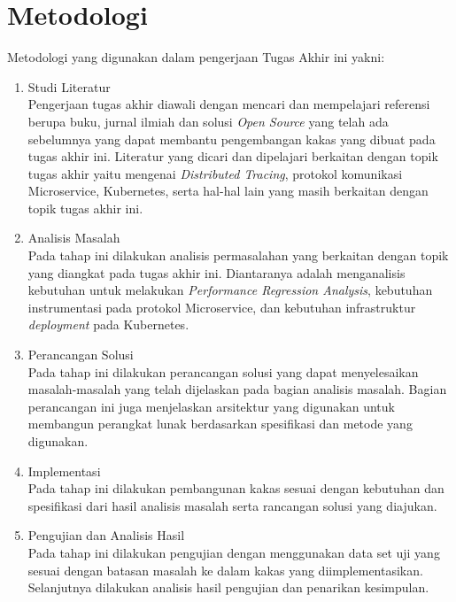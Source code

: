 \section{Metodologi}

Metodologi yang digunakan dalam pengerjaan Tugas Akhir ini yakni:
\begin{enumerate}
    \item Studi Literatur \\
          Pengerjaan tugas akhir diawali dengan mencari dan mempelajari referensi berupa buku, jurnal ilmiah dan solusi \textit{Open Source}  yang telah ada sebelumnya yang dapat membantu pengembangan kakas yang dibuat pada tugas akhir ini. Literatur yang dicari dan dipelajari berkaitan dengan topik tugas akhir yaitu mengenai \textit{Distributed Tracing},  protokol komunikasi Microservice, Kubernetes, serta hal-hal lain yang masih berkaitan dengan topik tugas akhir ini.

    \item Analisis Masalah \\
          Pada tahap ini dilakukan analisis permasalahan yang berkaitan dengan topik yang diangkat pada tugas akhir ini. Diantaranya adalah menganalisis kebutuhan untuk melakukan \textit{Performance Regression Analysis}, kebutuhan instrumentasi pada protokol Microservice, dan kebutuhan infrastruktur \textit{deployment} pada Kubernetes.

    \item Perancangan Solusi \\
          Pada tahap ini dilakukan perancangan solusi yang dapat menyelesaikan masalah-masalah yang telah dijelaskan pada bagian analisis masalah. Bagian perancangan ini juga menjelaskan arsitektur yang digunakan untuk membangun perangkat lunak berdasarkan spesifikasi dan metode yang digunakan.

    \item Implementasi \\
          Pada tahap ini dilakukan pembangunan kakas sesuai dengan kebutuhan dan spesifikasi dari hasil analisis masalah serta rancangan solusi yang diajukan.

    \item Pengujian dan Analisis Hasil \\
          Pada tahap ini dilakukan pengujian dengan menggunakan data set uji yang sesuai dengan batasan masalah ke dalam kakas yang diimplementasikan. Selanjutnya dilakukan analisis hasil pengujian dan penarikan kesimpulan.

\end{enumerate}

